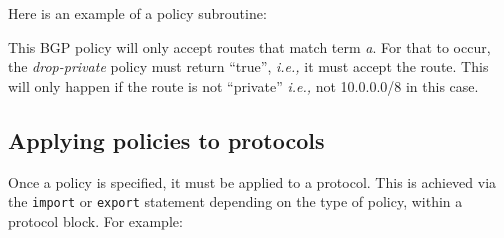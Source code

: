 Here is an example of a policy subroutine:

\noindent{}

This BGP policy will only accept routes that match term {\em a}.  For that to
occur, the {\em drop-private} policy must return ``true'', {\em i.e.,} it must
accept the route.  This will only happen if the route is not ``private'' {\em
i.e.,} not 10.0.0.0/8 in this case.  

\subsection{Applying policies to protocols}
Once a policy is specified, it must be applied to a protocol.  This is achieved
via the {\tt import} or {\tt export} statement depending on the type of policy,
within a protocol block.  For example:

